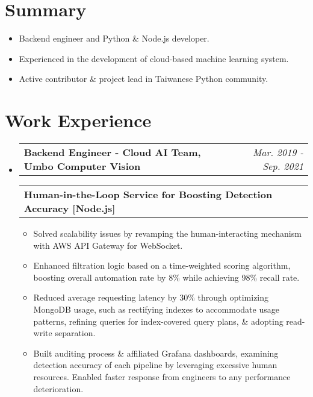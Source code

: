 \documentclass[letterpaper,11pt]{article}
\makeatletter
\newcommand{\resumeItem}[1]{
  \item\small{
    {#1 \vspace{-2pt}}
  }
}
\newcommand{\resumeSubheading}[2]{
  \vspace{-2pt}\item
    \begin{tabular*}{0.97\textwidth}[t]{l@{\extracolsep{\fill}}r}
      \textbf{#1} & \textit{\small #2} \\
    \end{tabular*}\vspace{-5pt}
}
\newcommand{\resumeSubSubheading}[1]{
    \begin{tabular*}{0.97\textwidth}{l@{\extracolsep{\fill}}r}
      \textbf{\small#1} \\
    \end{tabular*}\vspace{-5pt} 
}
\newcommand{\resumeSubHeadingListStart}{\begin{itemize}[leftmargin=*, label={}]}
\newcommand{\resumeItemListStart}{\begin{itemize}}
\newcommand{\resumeItemListEnd}{\end{itemize}\vspace{-5pt}}
\makeatother
\begin{document}
\section{Summary}
  \begin{itemize}[leftmargin=16px]
    \item\small{{Backend engineer and Python \& Node.js developer.  \vspace{-8pt}}}
    \item\small{{Experienced in the development of cloud-based machine learning system.  \vspace{-8pt}}}
    \item\small{{Active contributor \& project lead in Taiwanese Python community.   \vspace{-8pt}}}
  \resumeItemListEnd

\vspace{8pt}
\section{Work Experience}
  \resumeSubHeadingListStart
    \resumeSubheading
      {Backend Engineer - Cloud AI Team, Umbo Computer Vision}{Mar. 2019 - Sep. 2021}
      
      \vspace{4px}
      \resumeSubSubheading
        {\hspace{4px}Human-in-the-Loop Service for Boosting Detection Accuracy [Node.js]}
        \resumeItemListStart
          \resumeItem{Solved scalability issues by revamping the human-interacting mechanism with AWS API Gateway for WebSocket.}
          \resumeItem{Enhanced filtration logic based on a time-weighted scoring algorithm, boosting overall automation rate by 8\% while achieving 98\% recall rate.}
          \resumeItem{Reduced average requesting latency by 30\% through optimizing MongoDB usage, such as rectifying indexes to accommodate usage patterns, refining queries for index-covered query plans, \& adopting read-write separation.}
          \resumeItem{Built auditing process \& affiliated Grafana dashboards, examining detection accuracy of each pipeline by leveraging excessive human resources. Enabled faster response from engineers to any performance deterioration.}
        \resumeItemListEnd


\end{itemize}
\end{document}
